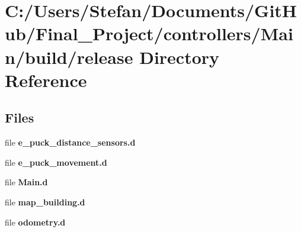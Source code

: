 \section{C\-:/\-Users/\-Stefan/\-Documents/\-Git\-Hub/\-Final\-\_\-\-Project/controllers/\-Main/build/release Directory Reference}
\label{dir_33396ef7498af4ba63da784be58c9ffe}
\subsection*{Files}
\begin{DoxyCompactItemize}
\item 
file {\bf e\-\_\-puck\-\_\-distance\-\_\-sensors.\-d}
\item 
file {\bf e\-\_\-puck\-\_\-movement.\-d}
\item 
file {\bf Main.\-d}
\item 
file {\bf map\-\_\-building.\-d}
\item 
file {\bf odometry.\-d}
\end{DoxyCompactItemize}
